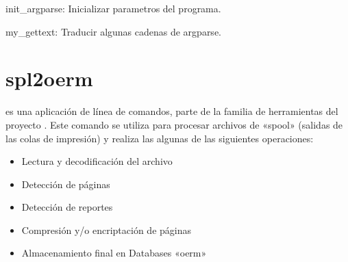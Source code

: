 \documentclass[a4paper,12pt,spanish]{sphinxmanual}
\begin{document}
\begin{fulllineitems}
\label{\detokenize{splprocessor:splprocessor.init_argparse}}
init\_argparse: Inicializar parametros del programa.

\end{fulllineitems}


\begin{fulllineitems}
\label{\detokenize{splprocessor:splprocessor.my_gettext}}
my\_gettext: Traducir algunas cadenas de argparse.

\end{fulllineitems}

\label{\detokenize{spl2oerm:spl2oerm}}\label{\detokenize{spl2oerm:module-spl2oerm}}\label{\detokenize{spl2oerm:spl2oerm}}

\section{spl2oerm}
\label{\detokenize{spl2oerm:id1}}\label{\detokenize{spl2oerm::doc}}
 es una aplicación de línea de comandos, parte de la familia de
herramientas del proyecto . Este
comando se utiliza para procesar archivos de «spool» (salidas de las colas de
impresión) y realiza las algunas de las siguientes operaciones:
\begin{itemize}
\item {} 
Lectura y decodificación del archivo

\item {} 
Detección de páginas

\item {} 
Detección de reportes

\item {} 
Compresión y/o encriptación de páginas

\item {} 
Almacenamiento final en Databases «oerm»

\end{itemize}
\end{document}
